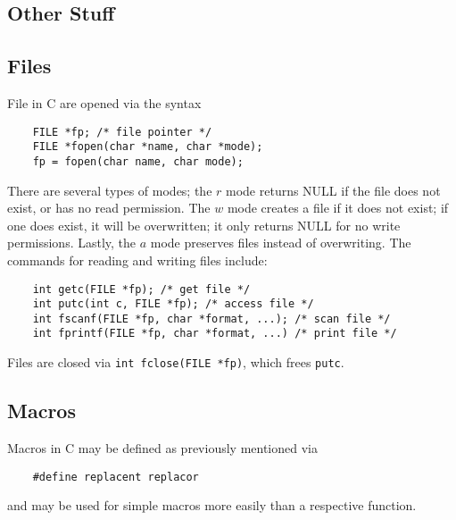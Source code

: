 \documentclass{tufte-book}
\begin{document}
\begin{fullwidth}
\chapter{Other Stuff}
\section{Files}
File in C are opened via the syntax
\begin{lstlisting}
    FILE *fp; /* file pointer */
    FILE *fopen(char *name, char *mode);
    fp = fopen(char name, char mode);
\end{lstlisting}
There are several types of modes; the $r$ mode returns NULL if the file does not exist, or has no read permission. The $w$ mode creates a file if it does not exist; if one does exist, it will be overwritten; it only returns NULL for no write permissions. Lastly, the $a$ mode preserves files instead of overwriting. The commands for reading and writing files include:
\begin{lstlisting}
    int getc(FILE *fp); /* get file */
    int putc(int c, FILE *fp); /* access file */
    int fscanf(FILE *fp, char *format, ...); /* scan file */
    int fprintf(FILE *fp, char *format, ...) /* print file */
\end{lstlisting}
Files are closed via \lstinline{int fclose(FILE *fp)}, which frees \lstinline{putc}.

\section{Macros}
Macros in C may be defined as previously mentioned via
\begin{lstlisting}
    #define replacent replacor
\end{lstlisting}
and may be used for simple macros more easily than a respective function.



\end{fullwidth}
\end{document}
